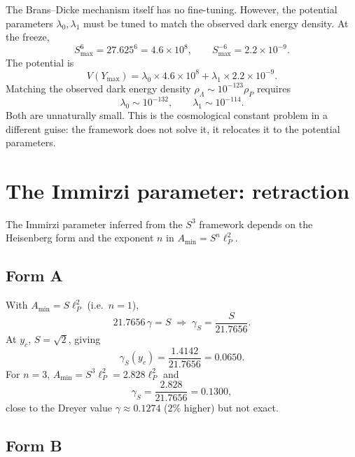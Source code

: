 \documentclass[12pt,oneside,openany]{book}
\begin{document}
The Brans--Dicke mechanism itself has no fine-tuning. However,
the potential parameters $\lambda_{0},\lambda_{1}$ must be tuned
to match the observed dark energy density. At the freeze,
\begin{equation}
S_{\max}^{6}=27.625^{6}=4.6\times10^{8},
\qquad
S_{\max}^{-6}=2.2\times10^{-9}.
\label{eq:S6}
\end{equation}
The potential is
\begin{equation}
V(Y_{\max})
=
\lambda_{0}\times4.6\times10^{8}
+
\lambda_{1}\times2.2\times10^{-9}.
\label{eq:Vfreeze}
\end{equation}
Matching the observed dark energy density
$\rho_{\Lambda}\sim10^{-123}\rho_{P}$ requires
\begin{equation}
\lambda_{0}\sim10^{-132},
\qquad
\lambda_{1}\sim10^{-114}.
\label{eq:lambda}
\end{equation}
Both are unnaturally small. This is the cosmological constant
problem in a different guise: the framework does not solve it,
it relocates it to the potential parameters.

\section{The Immirzi parameter: retraction}

The Immirzi parameter inferred from the $S^{3}$ framework
depends on the Heisenberg form and the exponent $n$ in
$A_{\text{min}}=S^{n}\ell_{P}^{2}$.

\subsection{Form A}

With $A_{\text{min}}=S\ell_{P}^{2}$ (i.e.\ $n=1$),
\begin{equation}
21.7656\,\gamma=S
\;\Longrightarrow\;
\gamma_{S}=\frac{S}{21.7656}.
\label{eq:gamma-A}
\end{equation}
At $y_{c}$, $S=\sqrt{2}$, giving
\begin{equation}
\gamma_{S}(y_{c})
=
\frac{1.4142}{21.7656}
=
0.0650.
\label{eq:gamma-A-yc}
\end{equation}
For $n=3$, $A_{\text{min}}=S^{3}\ell_{P}^{2}=2.828\ell_{P}^{2}$ and
\begin{equation}
\gamma_{S}=\frac{2.828}{21.7656}=0.1300,
\label{eq:gamma-n3}
\end{equation}
close to the Dreyer value $\gamma\approx0.1274$ ($2\%$ higher)
but not exact.

\subsection{Form B}
\end{document}
